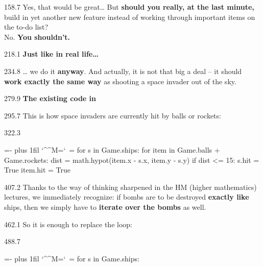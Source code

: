 \documentclass{aslab}
\makeatletter
\newcommand*\kw[1]{\textcolor{codeorange}{#1}}
\newcommand*\fn[1]{\textcolor{codecyan}{#1}}
\newcommand*\num[1]{\textcolor{codered}{#1}}
\newenvironment{pycode}{\par\ttfamily\hyphenchar\font=-1
  \lineskiplimit=-\maxdimen\lineskip=0pt\parindent=0pt
  \parfillskip=0pt plus 1fil\relax
  \catcode`\^^M=\active\catcode`\ =\active\py@setup\py@gobble}{}
\newcommand*\emo[1]{\makebox[18bp][l]{\emoji{#1}}}
\makeatother
\begin{document}
\begin{region}[pitch=13.7]{158.7}
Yes, that would be great\dots{} But \textbf{should you really, at the last
minute,} build in yet another new feature instead of working through
important items on the to-do list?\\
No. \textbf{You shouldn't.}
\end{region}

\begin{region}{218.1}
\emo{1F937}\textbf{Just like in real life\dots}
\end{region}

\begin{region}[pitch=14.3]{234.8}
\dots{} we do it \textbf{anyway}. And actually, it is not that big a deal --
it should \textbf{work exactly the same way} as shooting a space invader out
of the sky.
\end{region}

\begin{region}{279.9}
\emo{1F6E0}\textbf{The existing code in} 
\end{region}

\begin{region}{295.7}
This is how space invaders are currently hit by balls or rockets:
\end{region}

\begin{region}[]{322.3}
\begin{pycode}
\kw{for} s \kw{in} Game.ships:
    \kw{for} item  \kw{in} Game.balls + Game.rockets:
        dist = math.hypot(item.x - s.x, item.y - s.y)
        \kw{if} dist <= \num{15}:
           s.hit = \fn{True}
           item.hit = \fn{True}
\end{pycode}
\end{region}

\begin{region}[pitch=14.2]{407.2}
Thanks to the way of thinking sharpened in the HM (higher mathematics)
lectures, we immediately recognize: if bombs are to be destroyed
\textbf{exactly like} ships, then we simply have to \textbf{iterate over the
bombs} as well.
\end{region}

\begin{region}{462.1}
So it is enough to replace the loop:
\end{region}

\begin{region}[]{488.7}
\begin{pycode}
\kw{for} s \kw{in} Game.ships:
\end{pycode}
\end{region}
\end{document}

